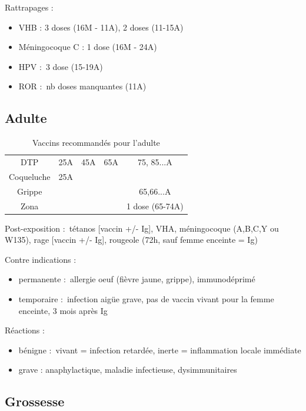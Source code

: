 \documentclass{article}
\begin{document}
Rattrapages :
\begin{itemize}
  \item VHB : 3 doses (16M - 11A), 2 doses (11-15A)
  \item Méningocoque C : 1 dose (16M - 24A)
  \item HPV : 3 dose (15-19A)
  \item ROR : nb doses manquantes (11A)
\end{itemize}

\subsection{Adulte}%
\label{sub:adulte}

\begin{table}[htpb]
  \centering
  \caption{Vaccins recommandés pour l'adulte}
  \begin{tabular}{*{5}{c}}
    DTP & 25A & 45A & 65A & 75, 85...A\\
    Coqueluche & 25A \\
    Grippe& & & & 65,66...A\\
    Zona& & & & 1 dose (65-74A)\\
  \end{tabular}
\end{table}

Post-exposition : tétanos [vaccin +/- Ig], VHA, méningocoque (A,B,C,Y ou W135), rage [vaccin +/-
Ig], rougeole (72h, sauf femme enceinte = Ig)

Contre indications :
\begin{itemize}
  \item permanente : allergie oeuf (fièvre jaune, grippe), immunodéprimé
    \item temporaire : infection aigüe grave, pas de vaccin vivant pour la femme
      enceinte, 3 mois après Ig
\end{itemize}

Réactions :
\begin{itemize}
  \item bénigne : vivant = infection retardée, inerte = inflammation locale
    immédiate
    \item grave : anaphylactique, maladie infectieuse, dysimmunitaires
\end{itemize}

\subsection{Grossesse}%
\label{sub:grossesse}
\end{document}
